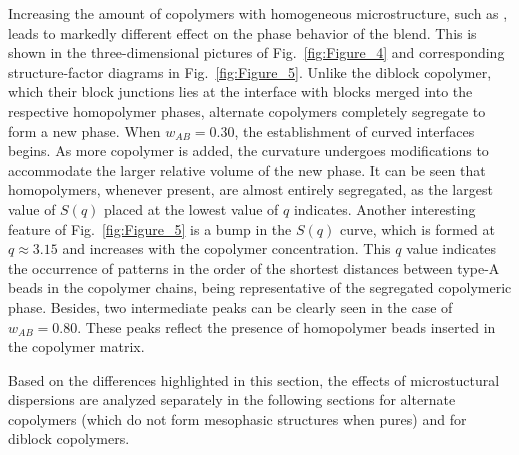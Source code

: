 \documentclass[
journal=mamobx,
manuscript=article,
]{achemso}
\begin{document}
Increasing the amount of copolymers with homogeneous microstructure, such as , leads to markedly different effect on the phase behavior of the blend.
This is shown in the three-dimensional pictures of Fig.~\ref{fig:Figure_4} and corresponding structure-factor diagrams in Fig.~\ref{fig:Figure_5}.
Unlike the diblock copolymer, which their block junctions lies at the interface with blocks merged into the respective homopolymer phases, alternate copolymers completely segregate to form a new phase.
When $w_{AB}=0.30$, the establishment of curved interfaces begins.
As more copolymer is added, the curvature undergoes modifications to accommodate the larger relative volume of the new phase.
It can be seen that homopolymers, whenever present, are almost entirely segregated, as the largest value of $S(q)$ placed at the lowest value of $q$ indicates.
Another interesting feature of Fig.~\ref{fig:Figure_5} is a bump in the $S(q)$ curve, which is formed at $q \approx 3.15$ and increases with the copolymer concentration.
This $q$ value indicates the occurrence of patterns in the order of the shortest distances between type-A beads in the copolymer chains, being representative of the segregated copolymeric phase.
Besides, two intermediate peaks can be clearly seen in the case of $w_{AB}=0.80$.
These peaks reflect the presence of homopolymer beads inserted in the copolymer matrix.

Based on the differences highlighted in this section, the effects of microstuctural dispersions are analyzed separately in the following sections for alternate copolymers (which do not form mesophasic structures when pures) and for diblock copolymers.
\end{document}

